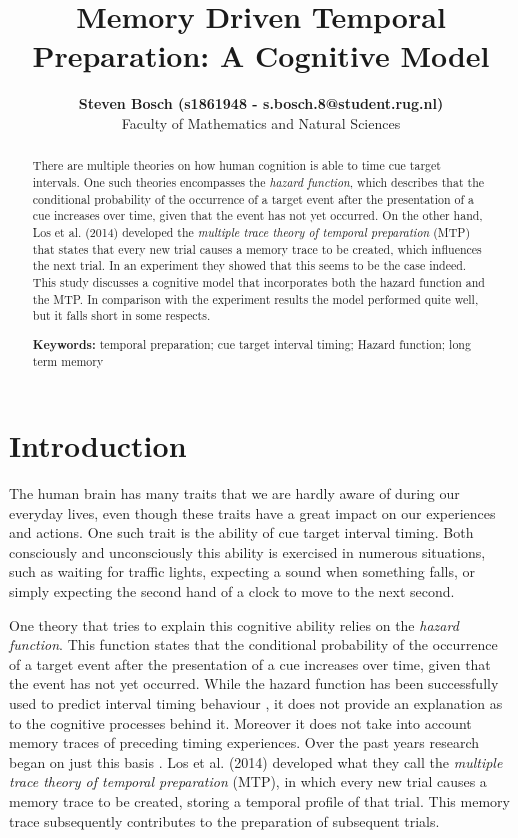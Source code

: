\documentclass[10pt,letterpaper]{article}
\title{Memory Driven Temporal Preparation: A Cognitive Model}
\author{{\large \bf Steven Bosch (s1861948 - s.bosch.8@student.rug.nl)} \\
  Faculty of Mathematics and Natural Sciences}
\begin{document}
\maketitle

\begin{abstract}
There are multiple theories on how human cognition is able to time cue target intervals. One such theories encompasses the \textit{hazard function}, which describes that the conditional probability of the occurrence of a target event after the presentation of a cue increases over time, given that the event has not yet occurred. On the other hand, Los et al. (2014) developed the \textit{multiple trace theory of temporal preparation} (MTP) that states that every new trial causes a memory trace to be created, which influences the next trial. In an experiment they showed that this seems to be the case indeed. This study discusses a cognitive model that incorporates both the hazard function and the MTP. In comparison with the experiment results the model performed quite well, but it falls short in some respects.

\textbf{Keywords:} 
temporal preparation; cue target interval timing; Hazard function; long term memory
\end{abstract}

\section{Introduction}
The human brain has many traits that we are hardly aware of during our everyday lives, even though these traits have a great impact on our experiences and actions. One such trait is the ability of cue target interval timing. Both consciously and unconsciously this ability is exercised in numerous situations, such as waiting for traffic lights, expecting a sound when something falls, or simply expecting the second hand of a clock to move to the next second. 

One theory that tries to explain this cognitive ability relies on the \textit{hazard function}. This function states that the conditional probability of the occurrence of a target event after the presentation of a cue increases over time, given that the event has not yet occurred. While the hazard function has been successfully used to predict interval timing behaviour \cite{Nobre, Vangkilde}, it does not provide an explanation as to the cognitive processes behind it. Moreover it does not take into account memory traces of preceding timing experiences. Over the past years research began on just this basis \cite{Los1, Howard, Taatgen}. Los et al. (2014) developed what they call the \textit{multiple trace theory of temporal preparation} (MTP), in which every new trial causes a memory trace to be created, storing a temporal profile of that trial. This memory trace subsequently contributes to the preparation of subsequent trials. 
\end{document}
